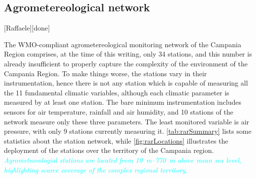 \documentclass[authoryear,preprint,review,12pt]{elsarticle}
\newcommand{\update}[1]{\emph{\textcolor{blue}{#1}}}
\newcommand{\review}[1]{\emph{\textcolor{cyan}{#1}}}
\newcommand{\gci}{\update{AgriMetSupport}\xspace}
\begin{document}

\subsection{Agrometereological network %
\label{RARStructure}}[Raffaele][done]

The WMO-compliant agrometereological monitoring network of the Campania Region comprises, at the time of this writing, only 34 stations, and this number is already insufficient to properly capture the complexity of the environment of the Campania Region.
To make things worse, the stations vary in their instrumentation, hence there is not any station which is capable of measuring all the 11 fundamental climatic variables, although each climatic parameter is measured by at least one station.
The bare minimum instrumentation includes sensors for air temperature, rainfall and air humidity, and 10 stations of the network measure only these three parameters.
The least monitored variable is air pressure, with only 9 stations currently measuring it.
\cref{tab:rarSummary} lists some statistics about the station network, while \cref{fig:rarLocations} illustrates the deployment of the stations over the territory of the Campania region.
\review{ Agrometeorologial stations are located from \SIrange{10}{770}{\metre} above mean sea level, highlighting scarce coverage of the complex regional territory. }
\end{document}
